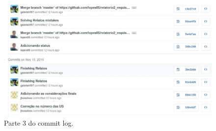 \begin{appendices}
\begin{figure}[!htpb]
\centering
\includegraphics[scale=0.35]{figuras/cronograma/foto_8_}
\caption{Parte 3 do commit log.}
\end{figure}

\end{appendices}
